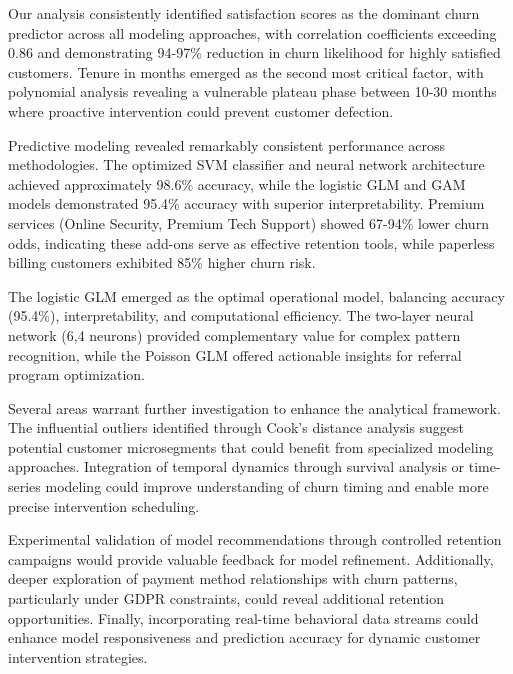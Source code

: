 \documentclass[
]{article}
\begin{document}
Our analysis consistently identified satisfaction scores as the dominant
churn predictor across all modeling approaches, with correlation
coefficients exceeding 0.86 and demonstrating 94-97\% reduction in churn
likelihood for highly satisfied customers. Tenure in months emerged as
the second most critical factor, with polynomial analysis revealing a
vulnerable plateau phase between 10-30 months where proactive
intervention could prevent customer defection.

Predictive modeling revealed remarkably consistent performance across
methodologies. The optimized SVM classifier and neural network
architecture achieved approximately 98.6\% accuracy, while the logistic
GLM and GAM models demonstrated 95.4\% accuracy with superior
interpretability. Premium services (Online Security, Premium Tech
Support) showed 67-94\% lower churn odds, indicating these add-ons serve
as effective retention tools, while paperless billing customers
exhibited 85\% higher churn risk.

The logistic GLM emerged as the optimal operational model, balancing
accuracy (95.4\%), interpretability, and computational efficiency. The
two-layer neural network (6,4 neurons) provided complementary value for
complex pattern recognition, while the Poisson GLM offered actionable
insights for referral program optimization.

Several areas warrant further investigation to enhance the analytical
framework. The influential outliers identified through Cook's distance
analysis suggest potential customer microsegments that could benefit
from specialized modeling approaches. Integration of temporal dynamics
through survival analysis or time-series modeling could improve
understanding of churn timing and enable more precise intervention
scheduling.

Experimental validation of model recommendations through controlled
retention campaigns would provide valuable feedback for model
refinement. Additionally, deeper exploration of payment method
relationships with churn patterns, particularly under GDPR constraints,
could reveal additional retention opportunities. Finally, incorporating
real-time behavioral data streams could enhance model responsiveness and
prediction accuracy for dynamic customer intervention strategies.
\end{document}
